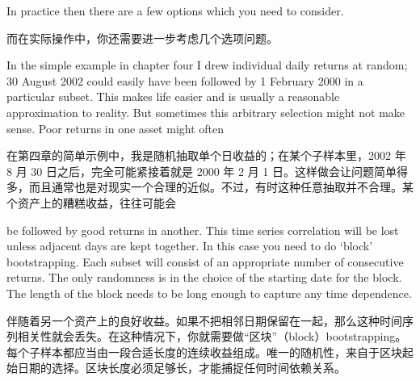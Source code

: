 \begin{englishblock} In practice then there are a few options which you need to consider. \end{englishblock}

\begin{chineseblock}而在实际操作中，你还需要进一步考虑几个选项问题。\end{chineseblock}


\begin{englishblock} In the simple example in chapter four I drew individual daily returns at random; 30 August 2002 could easily have been followed by 1 February 2000 in a particular subset. This makes life easier and is usually a reasonable approximation to reality. But sometimes this arbitrary selection might not make sense. Poor returns in one asset might often \end{englishblock}

\begin{chineseblock}在第四章的简单示例中，我是随机抽取单个日收益的；在某个子样本里，2002 年 8 月 30 日之后，完全可能紧接着就是 2000 年 2 月 1 日。这样做会让问题简单得多，而且通常也是对现实一个合理的近似。不过，有时这种任意抽取并不合理。某个资产上的糟糕收益，往往可能会\end{chineseblock}

\bipairgap

\begin{englishblock} be followed by good returns in another. This time series correlation will be lost unless adjacent days are kept together. In this case you need to do ‘block' bootstrapping. Each subset will consist of an appropriate number of consecutive returns. The only randomness is in the choice of the starting date for the block. The length of the block needs to be long enough to capture any time dependence. \end{englishblock}

\begin{chineseblock}伴随着另一个资产上的良好收益。如果不把相邻日期保留在一起，那么这种时间序列相关性就会丢失。在这种情况下，你就需要做“区块”（block）bootstrapping。每个子样本都应当由一段合适长度的连续收益组成。唯一的随机性，来自于区块起始日期的选择。区块长度必须足够长，才能捕捉任何时间依赖关系。\end{chineseblock}


